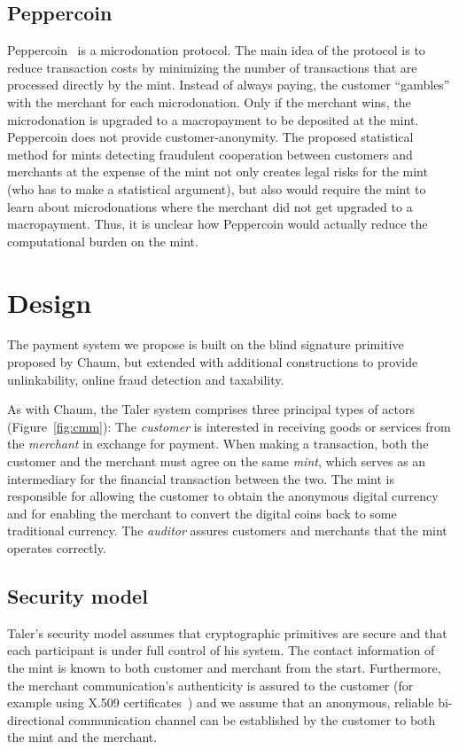 \documentclass{llncs}
\begin{document}
\subsection{Peppercoin}

Peppercoin~\cite{rivest2004peppercoin} is a microdonation protocol.
The main idea of the protocol is to reduce transaction costs by
minimizing the number of transactions that are processed directly by
the mint.  Instead of always paying, the customer ``gambles'' with the
merchant for each microdonation.  Only if the merchant wins, the
microdonation is upgraded to a macropayment to be deposited at the
mint.  Peppercoin does not provide customer-anonymity.  The proposed
statistical method for mints detecting fraudulent cooperation between
customers and merchants at the expense of the mint not only creates
legal risks for the mint (who has to make a statistical argument), but
also would require the mint to learn about microdonations where the
merchant did not get upgraded to a macropayment.  Thus, it is unclear
how Peppercoin would actually reduce the computational burden on the
mint.


\section{Design}

The payment system we propose is built on the blind signature
primitive proposed by Chaum, but extended with additional
constructions to provide unlinkability, online fraud detection and
taxability.

As with Chaum, the Taler system comprises three principal types of
actors (Figure~\ref{fig:cmm}): The \emph{customer} is interested in
receiving goods or services from the \emph{merchant} in exchange for
payment.  When making a transaction, both the customer and the
merchant must agree on the same \emph{mint}, which serves as an
intermediary for the financial transaction between the two.  The mint
is responsible for allowing the customer to obtain the anonymous
digital currency and for enabling the merchant to convert the
digital coins back to some traditional currency.  The \emph{auditor}
assures customers and merchants that the mint operates correctly.

\subsection{Security model}

Taler's security model assumes that cryptographic primitives are
secure and that each participant is under full control of his system.
The contact information of the mint is known to both customer and
merchant from the start.  Furthermore, the merchant communication's
authenticity is assured to the customer (for example using X.509
certificates~\cite{rfc5280}) and we assume that an anonymous, reliable
bi-directional communication channel can be established by the
customer to both the mint and the merchant.
\end{document}
